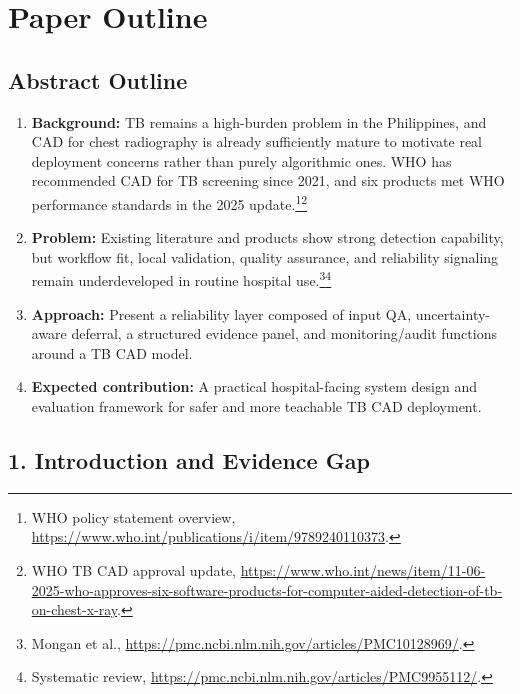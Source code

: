 \documentclass[11pt]{article}
\begin{document}
\section{Paper Outline}

\subsection{Abstract Outline}

\begin{enumerate}[leftmargin=1.8em]
    \item \textbf{Background:} TB remains a high-burden problem in the Philippines, and CAD for chest radiography is already sufficiently mature to motivate real deployment concerns rather than purely algorithmic ones. WHO has recommended CAD for TB screening since 2021, and six products met WHO performance standards in the 2025 update.\footnote{WHO policy statement overview, \url{https://www.who.int/publications/i/item/9789240110373}.}\footnote{WHO TB CAD approval update, \url{https://www.who.int/news/item/11-06-2025-who-approves-six-software-products-for-computer-aided-detection-of-tb-on-chest-x-ray}.}
    \item \textbf{Problem:} Existing literature and products show strong detection capability, but workflow fit, local validation, quality assurance, and reliability signaling remain underdeveloped in routine hospital use.\footnote{Mongan et al., \url{https://pmc.ncbi.nlm.nih.gov/articles/PMC10128969/}.}\footnote{Systematic review, \url{https://pmc.ncbi.nlm.nih.gov/articles/PMC9955112/}.}
    \item \textbf{Approach:} Present a reliability layer composed of input QA, uncertainty-aware deferral, a structured evidence panel, and monitoring/audit functions around a TB CAD model.
    \item \textbf{Expected contribution:} A practical hospital-facing system design and evaluation framework for safer and more teachable TB CAD deployment.
\end{enumerate}

\subsection{1. Introduction and Evidence Gap}
\end{document}
